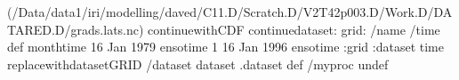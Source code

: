 \begin{ingrid}
(/Data/data1/iri/modelling/daved/C11.D/Scratch.D/V2T42p003.D/Work.D/DATARED.D/grads.lats.nc) continuewithCDF
continuedataset: 
grid:
/name /time def
monthtime
16 Jan 1979 ensotime
1
16 Jan 1996 ensotime
:grid
:dataset
time replacewithdatasetGRID
/dataset dataset .dataset def
/myproc undef
\end{ingrid}
